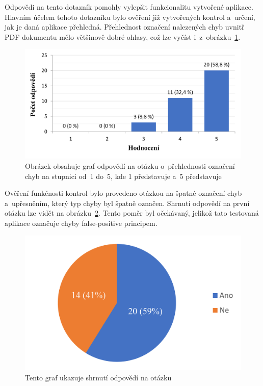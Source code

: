 Odpovědi na tento dotazník pomohly vylepšit funkcionalitu vytvořené aplikace.
Hlavním účelem tohoto dotazníku bylo ověření již vytvořených kontrol a~určení,
jak je daná aplikace přehledná. Přehlednost označení nalezených chyb
uvnitř PDF dokumentu mělo většinově dobré ohlasy, což lze
vyčíst i~z~obrázku~\ref{rate_checks}.

\begin{figure}[H]
    \centering
    \includegraphics[width=0.8\linewidth]{obrazky-figures/graph1.pdf}
    \caption{
        Obrázek obsahuje graf odpovědí
        na otázku o~přehlednosti označení chyb na stupnici od~1 do~5, kde 
        1 představuje 
        a~5 představuje 
    }
    \label{rate_checks}
\end{figure}

Ověření funkčnosti kontrol bylo provedeno otázkou na špatné označení chyb
a~upřesněním, který typ chyby byl špatně označen. Shrnutí odpovědí na
první otázku lze vidět na obrázku~\ref{pic_graph_false_mistakes}.
Tento poměr byl očekávaný, jelikož tato testovaná aplikace označuje chyby
false-positive principem.

\begin{figure}[H]
    \centering
    \includegraphics[width=0.6\linewidth]{obrazky-figures/graph_false_mistakes.pdf}
    \caption{
        Tento graf ukazuje shrnutí odpovědí na otázku 
    }
    \label{pic_graph_false_mistakes}
\end{figure}

